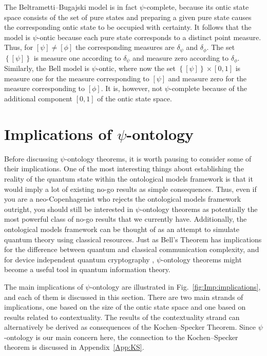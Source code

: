 \documentclass[DIV=calc,paper=a4,fontsize=11pt,twocolumn]{scrartcl} %
\theoremstyle{definition}
\theoremstyle{plain}
\newcommand{\Proj}[1]{\ensuremath{\left [ #1 \right ]}}
\begin{document}
The Beltrametti--Bugajski model is in fact $\psi$-complete, because its
ontic state space consists of the set of pure states and preparing a
given pure state causes the corresponding ontic state to be occupied
with certainty.  It follows that the model is $\psi$-ontic because
each pure state corresponds to a distinct point measure.  Thus, for
$\Proj{\psi} \neq \Proj{\phi}$ the corresponding measures are
$\delta_{\psi}$ and $\delta_{\phi}$.  The set $\left
\{\Proj{\psi} \right \}$ is measure one according to
$\delta_{\psi}$ and measure zero according to
$\delta_{\phi}$.  Similarly, the Bell model is $\psi$-ontic,
where now the set $\left \{\Proj{\psi} \right \} \times [0,1]$ is
measure one for the measure corresponding to $\Proj{\psi}$ and measure
zero for the measure corresponding to $\Proj{\phi}$.  It is, however,
not $\psi$-complete because of the additional component $[0,1]$ of the
ontic state space.

\section{Implications of $\psi$-ontology}

\label{Imp}

Before discussing $\psi$-ontology theorems, it is worth pausing to
consider some of their implications.  One of the most interesting
things about establishing the reality of the quantum state within the
ontological models framework is that it would imply a lot of existing
no-go results as simple consequences.  Thus, even if you are a
neo-Copenhagenist who rejects the ontological models framework
outright, you should still be interested in $\psi$-ontology theorems
as potentially the most powerful class of no-go results that we
currently have.  Additionally, the ontological models framework can be
thought of as an attempt to simulate quantum theory using classical
resources.  Just as Bell's Theorem has implications for the difference
between quantum and classical communication complexity, and for device
independent quantum cryptography \cite{Brunner2013}, $\psi$-ontology
theorems might become a useful tool in quantum information theory.

The main implications of $\psi$-ontology are illustrated in
Fig.~\ref{fig:Imp:implications}, and each of them is discussed in this
section.  There are two main strands of implications, one based on the
size of the ontic state space and one based on results related to
contextuality.  The results of the contextuality strand can
alternatively be derived as consequences of the Kochen--Specker
Theorem.  Since $\psi$-ontology is our main concern here, the
connection to the Kochen--Specker theorem is discussed in
Appendix~\ref{App:KS}.
\end{document}
